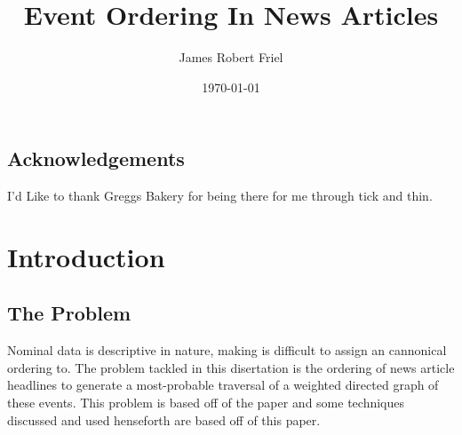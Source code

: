 \documentclass[bsc,frontabs,twoside,singlespacing,parskip,deptreport]{infthesis}     %
\begin{document}
\title{Event Ordering In News Articles}

\author{James Robert Friel}



\date{\today}

\abstract{}


\maketitle

\section*{Acknowledgements}
I'd Like to thank Greggs Bakery for being there for me through tick and thin.

\tableofcontents



\chapter{Introduction}
\section{The Problem}
Nominal data is descriptive in nature, making is difficult to assign an cannonical ordering to.
The problem tackled in this disertation is the ordering of news article headlines to generate
a most-probable traversal of a weighted directed graph of these events.
This problem is based off of the paper \cite{abend2015lexical} and some
techniques discussed and used henseforth are based off of this paper.
\end{document}
